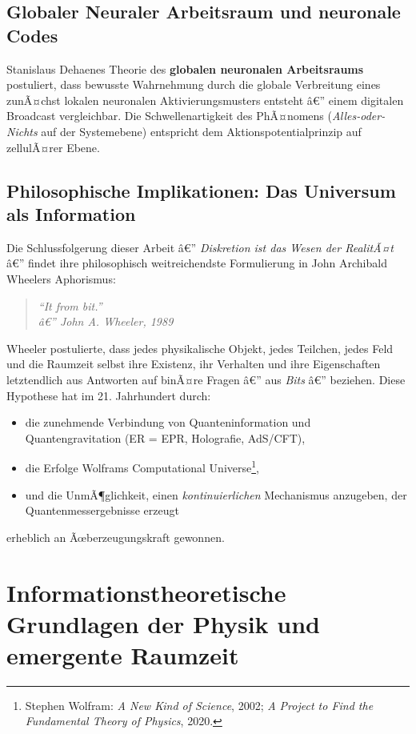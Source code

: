 ﻿\documentclass[12pt,a4paper,titlepage]{report}
\begin{document}
\subsection{Globaler Neuraler Arbeitsraum und neuronale Codes}

Stanislaus Dehaenes Theorie des \textbf{globalen neuronalen Arbeitsraums}
postuliert, dass bewusste Wahrnehmung durch die globale Verbreitung eines
zunÃ¤chst lokalen neuronalen Aktivierungsmusters entsteht â€” einem digitalen
Broadcast vergleichbar. Die Schwellenartigkeit des PhÃ¤nomens (\emph{Alles-oder-Nichts}
auf der Systemebene) entspricht dem Aktionspotentialprinzip auf zellulÃ¤rer Ebene.

\subsection{Philosophische Implikationen: Das Universum als Information}

Die Schlussfolgerung dieser Arbeit â€” \emph{Diskretion ist das Wesen der RealitÃ¤t}
â€” findet ihre philosophisch weitreichendste Formulierung in John Archibald Wheelers
Aphorismus:
\begin{quote}
    \itshape ``It from bit.'' \\[0.3em]
    \hfill â€” \textit{John A. Wheeler, 1989}
\end{quote}
Wheeler postulierte, dass jedes physikalische Objekt, jedes Teilchen, jedes
Feld und die Raumzeit selbst ihre Existenz, ihr Verhalten und ihre Eigenschaften
letztendlich aus Antworten auf binÃ¤re Fragen â€” aus \emph{Bits} â€” beziehen.
Diese Hypothese hat im 21. Jahrhundert durch:
\begin{itemize}[leftmargin=2em]
    \item die zunehmende Verbindung von Quanteninformation und Quantengravitation
        (ER = EPR, Holografie, AdS/CFT),
    \item die Erfolge Wolframs Computational Universe\footnote{Stephen Wolfram:
        \emph{A New Kind of Science}, 2002; \emph{A Project to Find the
        Fundamental Theory of Physics}, 2020.},
    \item und die UnmÃ¶glichkeit, einen \emph{kontinuierlichen} Mechanismus
        anzugeben, der Quantenmessergebnisse erzeugt
\end{itemize}
erheblich an Ãœberzeugungskraft gewonnen.

\section{Informationstheoretische Grundlagen der Physik und emergente Raumzeit}
\end{document}
